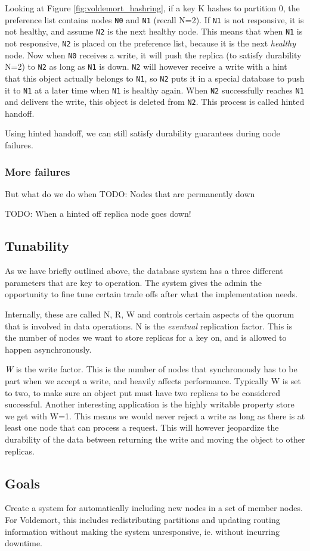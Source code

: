 Looking at Figure \ref{fig:voldemort_hashring}, if a key K hashes to partition 0, the preference list contains nodes \texttt{N0} and \texttt{N1} (recall N=2).
If \texttt{N1} is not responsive, it is not healthy, and assume \texttt{N2} is the next healthy node.
This means that when \texttt{N1} is not responsive, \texttt{N2} is placed on the preference list, because it is the next \emph{healthy} node.
Now when \texttt{N0} receives a write, it will push the replica (to satisfy durability N=2) to \texttt{N2} as long as \texttt{N1} is down.
\texttt{N2} will however receive a write with a hint that this object actually belongs to \texttt{N1}, so \texttt{N2} puts it in a special database to push it to \texttt{N1} at a later time when \texttt{N1} is healthy again. When \texttt{N2} successfully reaches \texttt{N1} and delivers the write, this object is deleted from \texttt{N2}.
This process is called hinted handoff. 

Using hinted handoff, we can still satisfy durability guarantees during node failures.

\subsubsection{More failures}
But what do we do when 
TODO: Nodes that are permanently down

TODO: When a hinted off replica node goes down!

\subsection{Tunability}
As we have briefly outlined above, the database system has a three different parameters that are key to operation.
The system gives the admin the opportunity to fine tune certain trade offs after what the implementation needs.

Internally, these are called N, R, W and controls certain aspects of the quorum that is involved in data operations. N is the \emph{eventual} replication factor. This is the number of nodes we want to store replicas for a key on, and is allowed to happen asynchronously.

\emph{W} is the write factor. This is the number of nodes that synchronously has to be part when we accept a write, and heavily affects performance. 
Typically W is set to two, to make sure an object put must have two replicas to be considered successful. 
Another interesting application is the highly writable property store we get with W=1. This means we would never reject a write as long as there is at least one node that can process a request. This will however jeopardize the durability of the data between returning the write and moving the object to other replicas.


\subsection{Goals}
Create a system for automatically including new nodes in a set of member nodes.
For Voldemort, this includes redistributing partitions and updating routing information without making the system unresponsive, ie. without incurring downtime.


